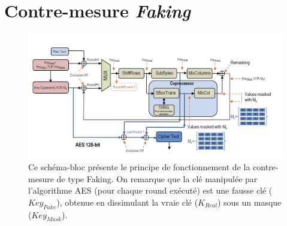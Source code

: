 \documentclass[oneside]{book}
\begin{document}
\section{Contre-mesure \textit{Faking}}
\label{ann:ConceptFaking}
\begin{figure}[htb]
    \centering
    \includegraphics[width=\linewidth]{image/ConceptFaking}
    \caption{Ce schéma-bloc présente le principe de fonctionnement de la contre-mesure de type Faking. On remarque que la clé manipulée par l'algorithme AES (pour chaque round exécuté) est une fausse clé ($Key_{Fake}$), obtenue en dissimulant la vraie clé ($K_{Real}$) sous un masque ($Key_{Mask}$).}
    \label{fig:ConceptFaking} 
\end{figure}

\newpage



\newpage


\end{document}
